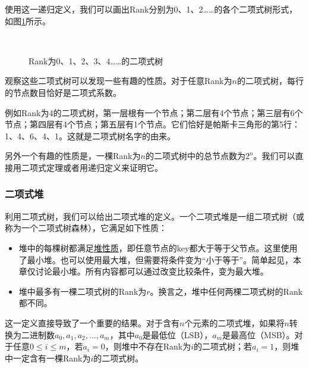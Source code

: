 \documentclass[UTF8]{article}
\begin{document}
使用这一递归定义，我们可以画出Rank分别为0、1、2……的各个二项式树形式，如图\ref{fig:bitree-forms}所示。

\begin{figure}[htbp]
  \centering
   \\
  \caption{Rank为0、1、2、3、4……的二项式树} \label{fig:bitree-forms}
\end{figure}

观察这些二项式树可以发现一些有趣的性质。对于任意Rank为$n$的二项式树，每行的节点数目恰好是二项式系数。

例如Rank为4的二项式树，第一层根有一个节点；第二层有4个节点；第三层有6个节点；第四层有4个节点；第五层有1个节点。它们恰好是帕斯卡三角形的第5行：1、4、6、4、1。这就是二项式树名字的由来。

另外一个有趣的性质是，一棵Rank为$n$的二项式树中的总节点数为$2^n$。我们可以直接用二项式定理或者用递归定义来证明它。

\subsubsection{二项式堆}
\label{Binomial heap} 

利用二项式树，我们可以给出二项式堆的定义。一个二项式堆是一组二项式树（或称为一个二项式树森林），它满足如下性质：

\begin{itemize}
\item 堆中的每棵树都满足\underline{堆性质}，即任意节点的key都大于等于父节点。这里使用了最小堆。也可以使用最大堆，但需要将条件变为“小于等于”。简单起见，本章仅讨论最小堆。所有内容都可以通过改变比较条件，变为最大堆。
\item 堆中最多有一棵二项式树的Rank为$r$。换言之，堆中任何两棵二项式树的Rank都不同。
\end{itemize}

这一定义直接导致了一个重要的结果。对于含有$n$个元素的二项式堆，如果将$n$转换为二进制数$a_0, a_1, a_2, ..., a_m$，其中$a_0$是最低位（LSB），$a_m$是最高位（MSB）。对于任意$0 \leq i \leq m$，若$a_i=0$，则堆中不存在Rank为$i$的二项式树；若$a_i = 1$，则堆中一定含有一棵Rank为$i$的二项式树。
\end{document}
